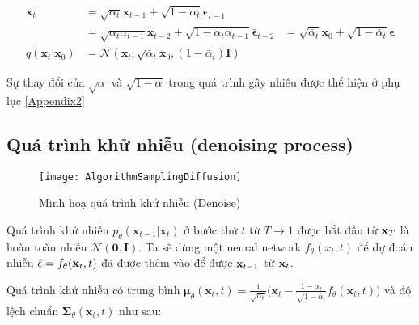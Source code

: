 \begin{equation}
	\label{eq:tracexzero}
	\begin{aligned}
		\mathbf{x}_t 
		&= \sqrt{\alpha_t}\mathbf{x}_{t-1} + \sqrt{1 - \alpha_t}\boldsymbol{\epsilon}_{t-1} \\
		&= \sqrt{\alpha_t \alpha_{t-1}} \mathbf{x}_{t-2} + \sqrt{1 - \alpha_t \alpha_{t-1}} \bar{\boldsymbol{\epsilon}}_{t-2}
		&= \sqrt{\bar{\alpha}_t}\mathbf{x}_0 + \sqrt{1 - \bar{\alpha}_t}\boldsymbol{\epsilon} \\
		q(\mathbf{x}_t \vert \mathbf{x}_0) &= \mathcal{N}(\mathbf{x}_t; \sqrt{\bar{\alpha}_t} \mathbf{x}_0, (1 - \bar{\alpha}_t)\mathbf{I})
	\end{aligned}
\end{equation}

Sự thay đổi của $\sqrt{\alpha}$ và  $\sqrt{1- \alpha}$ trong quá trình gây nhiễu được thể hiện ở phụ lục \ref{Appendix2}

\subsection{Quá trình khử nhiễu (denoising process)}
\label{subsection:denoising_process}

\setcounter{figure}{6}
\begin{figure}[H]
	\centering
	\texttt{[image: AlgorithmSamplingDiffusion]}
	\caption{Minh hoạ quá trình khử nhiễu (Denoise)}
	\label{fig:AlgorithmSamplingDiffusion}
	\vspace{-20pt}
\end{figure}

Quá trình khử nhiễu $p_\theta(\mathbf{x}_{t-1} \vert \mathbf{x}_t)$  ở bước thứ $t$ từ $T \to 1$ được bắt đầu từ $\mathbf{x}_T$ là hoàn toàn nhiễu $\mathcal{N} (\mathbf{0}, \mathbf{I})$. Ta sẽ dùng một neural network $f_{\theta} (x_t, t)$ để dự đoán nhiễu $\hat{\epsilon} = f_{\theta}(\mathbf{x}_t, t)$ đã được thêm vào để được $\mathbf{x}_{t-1}$ từ $\mathbf{x}_t$.

Quá trình khử nhiễu có trung bình $\boldsymbol{\mu}_\theta(\mathbf{x}_t, t) = {\frac{1}{\sqrt{\alpha_t}} \Big( \mathbf{x}_t - \frac{1 - \alpha_t}{\sqrt{1 - \bar{\alpha}_t}}  f_\theta(\mathbf{x}_t, t) \Big)}$ và độ lệch chuẩn $\boldsymbol{\Sigma}_\theta(\mathbf{x}_t, t)$ như sau:



